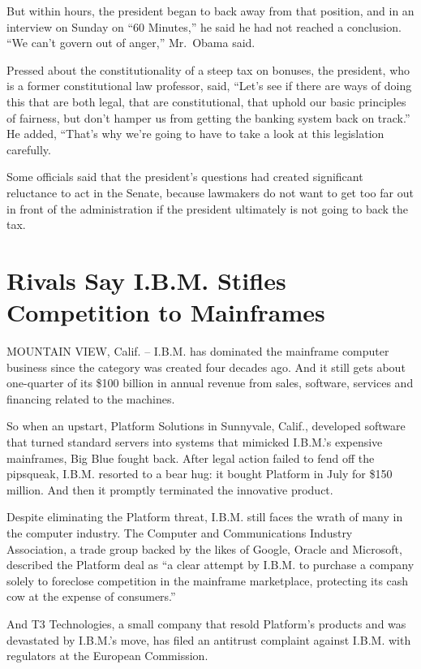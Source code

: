 \documentclass[12pt,a4paper,onecolumn]{article}
\begin{document}
\begin{CJK*}{GBK}{song}
But within hours, the president began to back away from that position, and in an interview on Sunday
on ``60 Minutes,'' he said he had not reached a conclusion. ``We can't govern out of anger,''
Mr.~Obama said.

Pressed about the constitutionality of a steep tax on bonuses, the president, who is a former
constitutional law professor, said, ``Let's see if there are ways of doing this that are both legal,
that are constitutional, that uphold our basic principles of fairness, but don't hamper us from
getting the banking system back on track.'' He added, ``That's why we're going to have to take a
look at this legislation carefully.

Some officials said that the president's questions had created significant reluctance to act in the
Senate, because lawmakers do not want to get too far out in front of the administration if the
president ultimately is not going to back the tax.

\section{Rivals Say I.B.M. Stifles Competition to Mainframes}

MOUNTAIN VIEW, Calif. -- I.B.M. has dominated the mainframe computer business since the category was
created four decades ago. And it still gets about one-quarter of its \$100 billion in annual revenue
from sales, software, services and financing related to the machines.

So when an upstart, Platform Solutions in Sunnyvale, Calif., developed software that turned standard
servers into systems that mimicked I.B.M.'s expensive mainframes, Big Blue fought back. After legal
action failed to fend off the pipsqueak, I.B.M. resorted to a bear hug: it bought Platform in July
for \$150 million. And then it promptly terminated the innovative product.

Despite eliminating the Platform threat, I.B.M. still faces the wrath of many in the computer
industry. The Computer and Communications Industry Association, a trade group backed by the likes of
Google, Oracle and Microsoft, described the Platform deal as ``a clear attempt by I.B.M. to purchase
a company solely to foreclose competition in the mainframe marketplace, protecting its cash cow at
the expense of consumers.''

And T3 Technologies, a small company that resold Platform's products and was devastated by I.B.M.'s
move, has filed an antitrust complaint against I.B.M. with regulators at the European Commission.


\end{CJK*}
\end{document}
